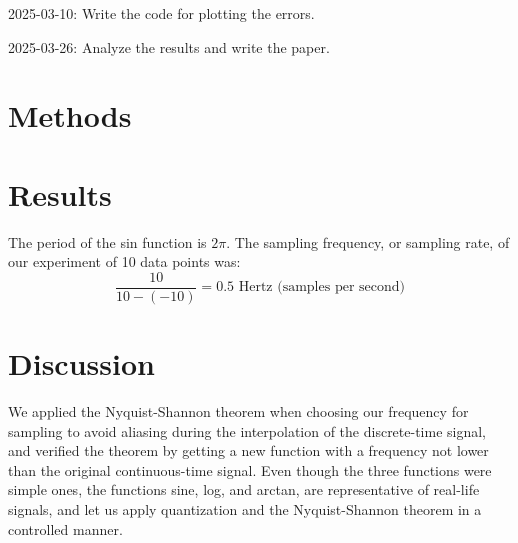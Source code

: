 \documentclass{article}
\begin{document}
2025-03-10: Write the code for plotting the errors.  

2025-03-26: Analyze the results and write the paper.  

\section{Methods}

\section{Results}

The period of the sin function is $2\pi$. The sampling frequency, or sampling rate, of our experiment of 10 data points was:  
$$\displaystyle\frac{10}{10-(-10)} = 0.5 \text{ Hertz (samples per second)}$$

\section{Discussion}

We applied the Nyquist-Shannon theorem when choosing our frequency for sampling to avoid aliasing during the interpolation of the discrete-time signal, and verified the theorem by getting a new function with a frequency not lower than the original continuous-time signal. 
Even though the three functions were simple ones, the functions sine, log, and arctan, are representative of real-life signals, and let us apply quantization and the Nyquist-Shannon theorem in a controlled manner.  
\end{document}
